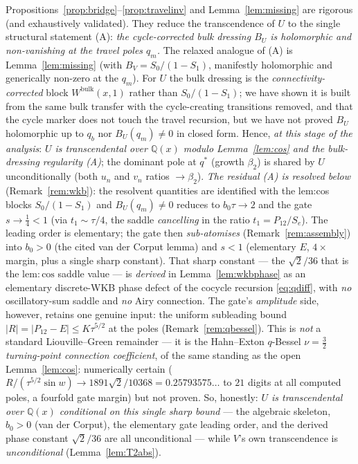 \begin{remark}[Status]\label{rem:liftstatus}
Propositions~\ref{prop:bridge}--\ref{prop:travelinv} and Lemma~\ref{lem:missing} are
rigorous (and exhaustively validated).  They reduce the transcendence of $U$ to the
single structural statement (A): \emph{the cycle-corrected bulk dressing $B_U$ is
holomorphic and non-vanishing at the travel poles $q_m$.}  The relaxed analogue of
(A) is Lemma~\ref{lem:missing} (with $B_V=S_0/(1-S_1)$, manifestly holomorphic and
generically non-zero at the $q_m$).  For $U$ the bulk dressing is the
\emph{connectivity-corrected} block $W^{\mathrm{bulk}}(x,1)$ rather than
$S_0/(1-S_1)$; we have shown it is built from the same bulk transfer with the
cycle-creating transitions removed, and that the cycle marker does not touch the
travel recursion, but we have not proved $B_U$ holomorphic up to $q_b$ nor
$B_U(q_m)\ne0$ in closed form.  Hence, \emph{at this stage of the analysis}:
\emph{$U$ is transcendental over $\mathbb Q(x)$ modulo Lemma~\ref{lem:cos} and the
bulk-dressing regularity (A)}; the dominant pole at $q^\ast$ \textup(growth
$\beta_2$\textup) is shared by $U$ unconditionally (both $u_n$ and $v_n$ ratios
$\to\beta_2$). \emph{The residual (A) is resolved below} (Remark~\ref{rem:wkb}): the
resolvent quantities are identified with the lem:cos blocks $S_0/(1-S_1)$ and
$B_U(q_m)\ne0$ reduces to $b_0\tau\to2$ and the gate $s\to\tfrac14<1$ (via $t_1\sim\tau/4$, the saddle
\emph{cancelling} in the ratio $t_1=P_{12}/S_e$). The leading order is elementary; the gate then
\emph{sub-atomises} (Remark~\ref{rem:assembly}) into $b_0>0$ (the cited van der Corput lemma) and $s<1$
(elementary $E$, $4\times$ margin, plus a single sharp constant). That sharp constant --- the $\sqrt2/36$ that is
the $\mathrm{lem:cos}$ saddle value --- is \emph{derived} in Lemma~\ref{lem:wkbphase} as an elementary
discrete-WKB phase defect of the cocycle recursion \eqref{eq:qdiff}, with \emph{no} oscillatory-sum saddle and
\emph{no} Airy connection. The gate's \emph{amplitude} side, however, retains one genuine input: the uniform
subleading bound $|R|=|P_{12}-E|\le K\tau^{5/2}$ at the poles (Remark~\ref{rem:qbessel}). This is \emph{not} a
standard Liouville--Green remainder --- it is the Hahn--Exton $q$-Bessel $\nu=\tfrac32$ \emph{turning-point
connection coefficient}, of the same standing as the open Lemma~\ref{lem:cos}: numerically certain
($R/(\tau^{5/2}\sin w)\to1891\sqrt2/10368=0.25793575\ldots$ to $21$ digits at all computed poles, a fourfold gate
margin) but not proven. So, honestly: \emph{$U$ is transcendental over $\mathbb Q(x)$ conditional on this single
sharp bound} --- the algebraic skeleton, $b_0>0$ (van der Corput), the elementary gate leading order, and the
derived phase constant $\sqrt2/36$ are all unconditional --- while $V$'s own transcendence is \emph{unconditional}
(Lemma~\ref{lem:T2abs}).
\end{remark}

